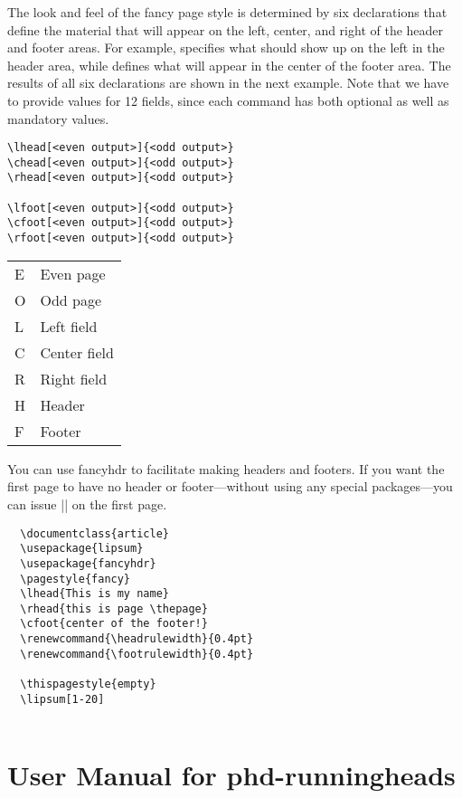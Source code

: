 The look and feel of the fancy page style is determined by six declarations that define the material that will appear on the left, center, and right of the header
and footer areas. For example,  specifies what should show up on the left
in the header area, while  defines what will appear in the center of the
footer area. The results of all six declarations are shown in the next example. Note that we have to provide values for 12 fields, since each command has both optional as well as mandatory values.

\begin{verbatim}
\lhead[<even output>]{<odd output>}
\chead[<even output>]{<odd output>}
\rhead[<even output>]{<odd output>}

\lfoot[<even output>]{<odd output>}
\cfoot[<even output>]{<odd output>}
\rfoot[<even output>]{<odd output>}
\end{verbatim}

\begin{tabular}{ll}
E  &Even page\\
O &Odd page\\
L  &Left field\\
C &Center field\\
R &Right field\\
H &Header\\
F  &Footer\\
\end{tabular}

You can use fancyhdr to facilitate making headers and footers. If you want the first page to have no header or footer---without using any special packages---you can issue |\thispagestyle{empty}| on the first page.


\begin{verbatim}
  \documentclass{article}
  \usepackage{lipsum}
  \usepackage{fancyhdr}
  \pagestyle{fancy}
  \lhead{This is my name}
  \rhead{this is page \thepage}
  \cfoot{center of the footer!}
  \renewcommand{\headrulewidth}{0.4pt}
  \renewcommand{\footrulewidth}{0.4pt}
  
  \thispagestyle{empty}
  \lipsum[1-20]
  
\end{verbatim}

\chapter{User Manual for phd-runningheads}

